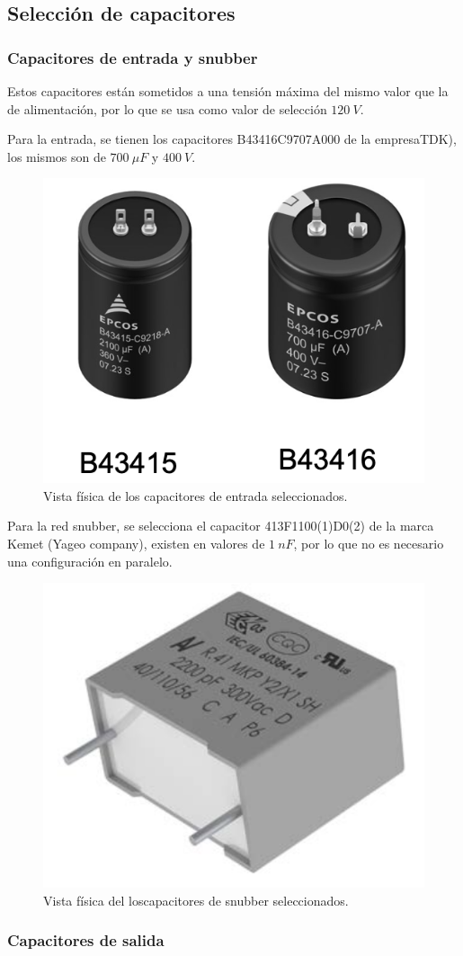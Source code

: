 \subsection{Selección de capacitores}

\subsubsection{Capacitores de entrada y snubber}

Estos capacitores están sometidos a una tensión máxima del mismo valor que la de alimentación, por lo que se usa como valor de selección $120 \ V$. 

Para la entrada, se tienen los capacitores B43416C9707A000 de la empresaTDK), los mismos son de $700 \ \mu F$ y $400 \ V$.

\begin{figure}
	\centering
	\includegraphics[width=0.4\linewidth]{img/capa_entrada}
	\caption{Vista física de los capacitores de entrada seleccionados.}
	\label{fig:capaentrada}
\end{figure}


Para la red snubber, se selecciona el capacitor 413F1100(1)D0(2)  de la marca Kemet (Yageo company), existen en valores de $1 \ nF$, por lo que no es necesario una configuración en paralelo.

\begin{figure}
	\centering
	\includegraphics[width=0.3\linewidth]{img/capa_snubber}
	\caption{Vista física del loscapacitores de snubber seleccionados.}
	\label{fig:capasnubber}
\end{figure}

\subsubsection{Capacitores de salida}

